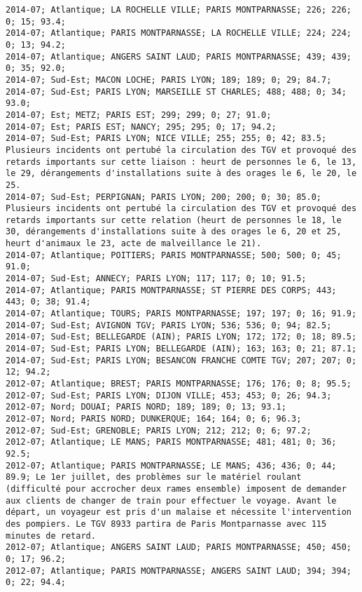 \documentclass{article}
\begin{document}
\begin{Verbatim}[commandchars=\\\{\}]
2014-07; Atlantique; LA ROCHELLE VILLE; PARIS MONTPARNASSE; 226; 226; 0; 15; 93.4; 
2014-07; Atlantique; PARIS MONTPARNASSE; LA ROCHELLE VILLE; 224; 224; 0; 13; 94.2; 
2014-07; Atlantique; ANGERS SAINT LAUD; PARIS MONTPARNASSE; 439; 439; 0; 35; 92.0; 
2014-07; Sud-Est; MACON LOCHE; PARIS LYON; 189; 189; 0; 29; 84.7; 
2014-07; Sud-Est; PARIS LYON; MARSEILLE ST CHARLES; 488; 488; 0; 34; 93.0; 
2014-07; Est; METZ; PARIS EST; 299; 299; 0; 27; 91.0; 
2014-07; Est; PARIS EST; NANCY; 295; 295; 0; 17; 94.2; 
2014-07; Sud-Est; PARIS LYON; NICE VILLE; 255; 255; 0; 42; 83.5; Plusieurs incidents ont pertubé la circulation des TGV et provoqué des retards importants sur cette liaison : heurt de personnes le 6, le 13, le 29, dérangements d'installations suite à des orages le 6, le 20, le 25.
2014-07; Sud-Est; PERPIGNAN; PARIS LYON; 200; 200; 0; 30; 85.0; Plusieurs incidents ont pertubé la circulation des TGV et provoqué des retards importants sur cette relation (heurt de personnes le 18, le 30, dérangements d'installations suite à des orages le 6, 20 et 25, heurt d'animaux le 23, acte de malveillance le 21).
2014-07; Atlantique; POITIERS; PARIS MONTPARNASSE; 500; 500; 0; 45; 91.0; 
2014-07; Sud-Est; ANNECY; PARIS LYON; 117; 117; 0; 10; 91.5; 
2014-07; Atlantique; PARIS MONTPARNASSE; ST PIERRE DES CORPS; 443; 443; 0; 38; 91.4; 
2014-07; Atlantique; TOURS; PARIS MONTPARNASSE; 197; 197; 0; 16; 91.9; 
2014-07; Sud-Est; AVIGNON TGV; PARIS LYON; 536; 536; 0; 94; 82.5; 
2014-07; Sud-Est; BELLEGARDE (AIN); PARIS LYON; 172; 172; 0; 18; 89.5; 
2014-07; Sud-Est; PARIS LYON; BELLEGARDE (AIN); 163; 163; 0; 21; 87.1; 
2014-07; Sud-Est; PARIS LYON; BESANCON FRANCHE COMTE TGV; 207; 207; 0; 12; 94.2; 
2012-07; Atlantique; BREST; PARIS MONTPARNASSE; 176; 176; 0; 8; 95.5; 
2012-07; Sud-Est; PARIS LYON; DIJON VILLE; 453; 453; 0; 26; 94.3; 
2012-07; Nord; DOUAI; PARIS NORD; 189; 189; 0; 13; 93.1; 
2012-07; Nord; PARIS NORD; DUNKERQUE; 164; 164; 0; 6; 96.3; 
2012-07; Sud-Est; GRENOBLE; PARIS LYON; 212; 212; 0; 6; 97.2; 
2012-07; Atlantique; LE MANS; PARIS MONTPARNASSE; 481; 481; 0; 36; 92.5; 
2012-07; Atlantique; PARIS MONTPARNASSE; LE MANS; 436; 436; 0; 44; 89.9; Le 1er juillet, des problèmes sur le matériel roulant (difficulté pour accrocher deux rames ensemble) imposent de demander aux clients de changer de train pour effectuer le voyage. Avant le départ, un voyageur est pris d'un malaise et nécessite l'intervention des pompiers. Le TGV 8933 partira de Paris Montparnasse avec 115 minutes de retard.
2012-07; Atlantique; ANGERS SAINT LAUD; PARIS MONTPARNASSE; 450; 450; 0; 17; 96.2; 
2012-07; Atlantique; PARIS MONTPARNASSE; ANGERS SAINT LAUD; 394; 394; 0; 22; 94.4; 

\end{Verbatim}
\end{document}
